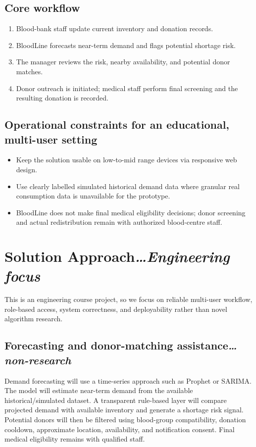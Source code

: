 \documentclass[11pt]{article}
\newcommand{\secnote}[2]{\section{#1\hfill\normalfont\normalsize\itshape #2}}
\newcommand{\subsecnote}[2]{\subsection{#1\hfill\normalfont\normalsize\itshape #2}}
\begin{document}
\subsection{Core workflow}

\begin{enumerate}
\item Blood-bank staff update current inventory and donation records.
\item BloodLine forecasts near-term demand and flags potential shortage risk.
\item The manager reviews the risk, nearby availability, and potential donor matches.
\item Donor outreach is initiated; medical staff perform final screening and the resulting donation
is recorded.
\end{enumerate}

\subsection{Operational constraints for an educational, multi-user setting}

\begin{itemize}
\item Keep the solution usable on low-to-mid range devices via responsive web design.
\item Use clearly labelled simulated historical demand data where granular real consumption data
is unavailable for the prototype.
\item BloodLine does not make final medical eligibility decisions; donor screening and actual
redistribution remain with authorized blood-centre staff.
\end{itemize}

\secnote{Solution Approach}{\ldots Engineering focus}

This is an engineering course project, so we focus on reliable multi-user workflow, role-based
access, system correctness, and deployability rather than novel algorithm research.

\subsecnote{Forecasting and donor-matching assistance}{\ldots non-research}

Demand forecasting will use a time-series approach such as Prophet or SARIMA. The model will
estimate near-term demand from the available historical/simulated dataset. A transparent rule-based layer will compare projected demand with available inventory and generate a shortage
risk signal. Potential donors will then be filtered using blood-group compatibility, donation
cooldown, approximate location, availability, and notification consent. Final medical eligibility
remains with qualified staff.
\end{document}
